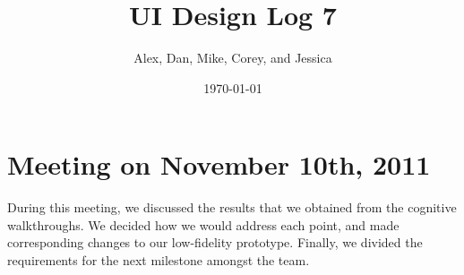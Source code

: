 \documentclass{article}
\title{UI Design Log 7}
\author{Alex, Dan, Mike, Corey, and Jessica}
\date{\today}
\begin{document}
\maketitle
\section{Meeting on November 10th, 2011}
During this meeting, we discussed the results that we obtained from the
cognitive walkthroughs. We decided how we would address each point, and made
corresponding changes to our low-fidelity prototype. Finally, we divided the
requirements for the next milestone amongst the team.
\end{document}
